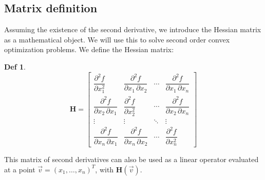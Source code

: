 \documentclass[../convex_optimization.tex]{subfiles}
\theoremstyle{definition} \newtheorem{defi}{Def}
\theoremstyle{definition} \newtheorem{prop}{Prop}
\begin{document}
\subsection{Matrix definition}
Assuming the existence of the second derivative, we introduce
the Hessian matrix as a mathematical object. We will use this
to solve second order convex optimization problems.
We define the Hessian matrix:
\begin{defi}
\begin{equation}
    \mathbf H = \begin{bmatrix}
        \dfrac{\partial^2 f}{\partial x_1^2} &
        \dfrac{\partial^2 f}{\partial x_1\,\partial x_2} &
        \cdots & \dfrac{\partial^2 f}{\partial x_1\,\partial x_n} \\[2.2ex]
        \dfrac{\partial^2 f}{\partial x_2\,\partial x_1} &
        \dfrac{\partial^2 f}{\partial x_2^2} & \cdots &
        \dfrac{\partial^2 f}{\partial x_2\,\partial x_n} \\[2.2ex]
        \vdots & \vdots & \ddots & \vdots \\[2.2ex]
        \dfrac{\partial^2 f}{\partial x_n\,\partial x_1} &
        \dfrac{\partial^2 f}{\partial x_n\,\partial x_2} &
        \cdots & \dfrac{\partial^2 f}{\partial x_n^2}
    \end{bmatrix}
    \label{hessian_matrix_definition}
\end{equation}
    \label{hessian_definition}
\end{defi}

This matrix of second derivatives can also be used as a linear
operator evaluated at a point $\vec{v}=(x_1, \ldots, x_n)^T$,
with $\mathbf H(\vec{v})$.
\end{document}
